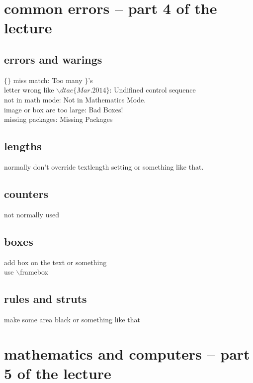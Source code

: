 \documentclass[11pt,a4paper]{article}
\begin{document}
\section{common errors -- part 4 of the lecture}{
  


  \subsection{errors and warings}{
    $\{\}$ miss match: Too many $\}$'s \\
    letter wrong like $\backslash dtae\{Mar.2014\}$: Undifined control sequence\\
    not in math mode: Not in Mathematics Mode. \\
    image or box are too large: Bad Boxes! \\
    missing packages: Missing Packages \\
  }
  
  \subsection{lengths}{
    normally don't override textlength setting or something like that.
  }
  \subsection{counters}{not normally used}
  \subsection{boxes}{
    add box on the text or \framebox something \\
    use $\backslash$framebox
  }
  \subsection{rules and struts}{
    make some area black or something like that
  }
}


\section{mathematics and computers -- part 5 of the lecture}{
  
}
\end{document}
